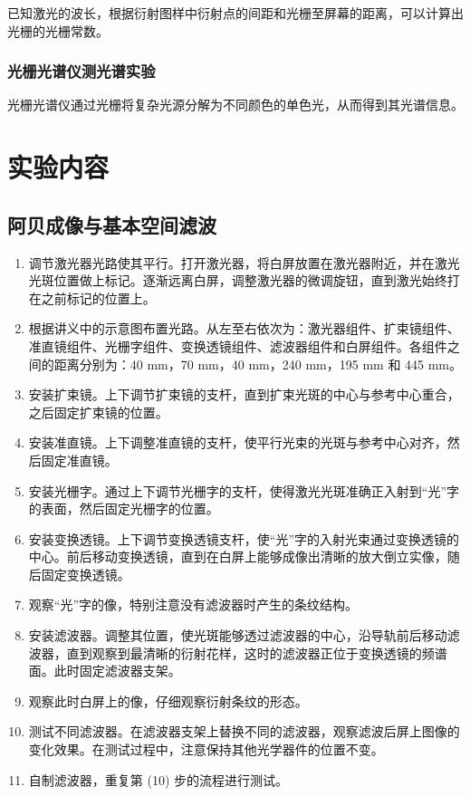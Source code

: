 \documentclass[UTF-8,twoside,cs4size]{ctexart}
\begin{document}
已知激光的波长，根据衍射图样中衍射点的间距和光栅至屏幕的距离，可以计算出光栅的光栅常数。

\subsubsection{光栅光谱仪测光谱实验}
光栅光谱仪通过光栅将复杂光源分解为不同颜色的单色光，从而得到其光谱信息。

\section{实验内容}
\subsection{阿贝成像与基本空间滤波}
\begin{enumerate}
    \item 调节激光器光路使其平行。打开激光器，将白屏放置在激光器附近，并在激光光斑位置做上标记。逐渐远离白屏，调整激光器的微调旋钮，直到激光始终打在之前标记的位置上。
    
    \item 根据讲义中的示意图布置光路。从左至右依次为：激光器组件、扩束镜组件、准直镜组件、光栅字组件、变换透镜组件、滤波器组件和白屏组件。各组件之间的距离分别为：40 mm，70 mm，40 mm，240 mm，195 mm 和 445 mm。
    
    \item 安装扩束镜。上下调节扩束镜的支杆，直到扩束光斑的中心与参考中心重合，之后固定扩束镜的位置。
    
    \item 安装准直镜。上下调整准直镜的支杆，使平行光束的光斑与参考中心对齐，然后固定准直镜。
    
    \item 安装光栅字。通过上下调节光栅字的支杆，使得激光光斑准确正入射到“光”字的表面，然后固定光栅字的位置。
    
    \item 安装变换透镜。上下调节变换透镜支杆，使“光”字的入射光束通过变换透镜的中心。前后移动变换透镜，直到在白屏上能够成像出清晰的放大倒立实像，随后固定变换透镜。
    
    \item 观察“光”字的像，特别注意没有滤波器时产生的条纹结构。
    
    \item 安装滤波器。调整其位置，使光斑能够透过滤波器的中心，沿导轨前后移动滤波器，直到观察到最清晰的衍射花样，这时的滤波器正位于变换透镜的频谱面。此时固定滤波器支架。
    
    \item 观察此时白屏上的像，仔细观察衍射条纹的形态。
    
    \item 测试不同滤波器。在滤波器支架上替换不同的滤波器，观察滤波后屏上图像的变化效果。在测试过程中，注意保持其他光学器件的位置不变。
    
    \item 自制滤波器，重复第 (10) 步的流程进行测试。
\end{enumerate}
\end{document}
